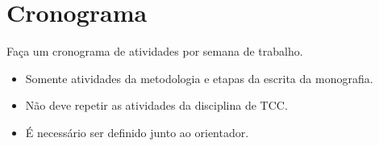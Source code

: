 \chapter{Cronograma}

Faça um cronograma de atividades por semana de trabalho.
\begin{itemize}
\item Somente atividades da metodologia e etapas da escrita da monografia.
\item Não deve repetir as atividades da disciplina de TCC.
\item É necessário ser definido junto ao orientador.
\end{itemize}
